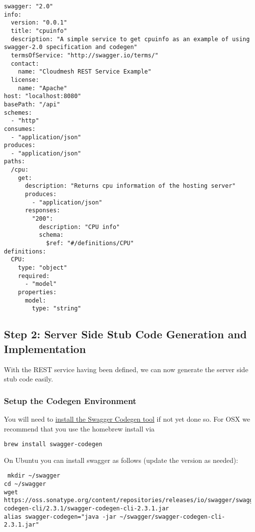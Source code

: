 \begin{lstlisting}
swagger: "2.0"
info: 
  version: "0.0.1"
  title: "cpuinfo"
  description: "A simple service to get cpuinfo as an example of using swagger-2.0 specification and codegen"
  termsOfService: "http://swagger.io/terms/"
  contact: 
    name: "Cloudmesh REST Service Example"
  license: 
    name: "Apache"
host: "localhost:8080"
basePath: "/api"
schemes: 
  - "http"
consumes: 
  - "application/json"
produces: 
  - "application/json"
paths: 
  /cpu:
    get: 
      description: "Returns cpu information of the hosting server"
      produces: 
        - "application/json"
      responses: 
        "200":
          description: "CPU info"
          schema: 
            $ref: "#/definitions/CPU"
definitions:
  CPU:
    type: "object"
    required: 
      - "model"
    properties: 
      model:
        type: "string"
\end{lstlisting}


\subsection{Step 2: Server Side Stub Code Generation and
Implementation}\label{s:step-2-swagger-code-gen}

With the REST service having been defined, we can now generate the
server side stub code easily.

\subsubsection{Setup the Codegen
Environment}\label{setup-the-codegen-environment}

You will need to \href{https://swagger.io/docs/swagger-tools/}{install
the Swagger Codegen tool} if not yet done so. For OSX we recommend
that you use the homebrew install via 

\begin{lstlisting}
brew install swagger-codegen
\end{lstlisting}

On Ubuntu you can install swagger as follows (update the version as needed):

\begin{lstlisting}
 mkdir ~/swagger
cd ~/swagger
wget https://oss.sonatype.org/content/repositories/releases/io/swagger/swagger-codegen-cli/2.3.1/swagger-codegen-cli-2.3.1.jar
alias swagger-codegen="java -jar ~/swagger/swagger-codegen-cli-2.3.1.jar"
\end{lstlisting}

